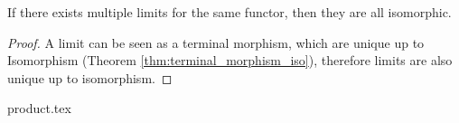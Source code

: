\begin{theorem}
	If there exists multiple limits for the same functor, then they are all
	isomorphic.

	\begin{proof}
		A limit can be seen as a terminal morphism, which are unique up to
		Isomorphism (Theorem \ref{thm:terminal_morphism_iso}), therefore limits are
		also unique up to isomorphism.
	\end{proof}
\end{theorem}

{product.tex}




